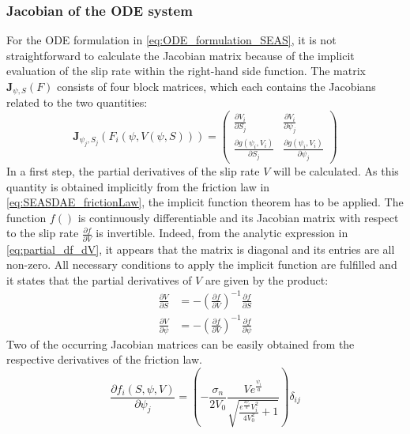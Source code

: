 \subsubsection{Jacobian of the ODE system}
\label{sssec:Jacobian_ODE}
For the ODE formulation in \autoref{eq:ODE_formulation_SEAS}, it is not straightforward to calculate the Jacobian matrix because of the implicit evaluation of the slip rate within the right-hand side function. The matrix $\mathbf{J}_{\psi,S}(F)$ consists of four block matrices, which each contains the Jacobians related to the two quantities:
\begin{equation}
	\label{eq:Jacobian_ODE_formulation}
	\mathbf{J}_{\psi_j,S_j}\left(F_i\left(\psi,V(\psi,S)\right)\right) = \begin{pmatrix} 
	\frac{\partial V_i}{\partial S_j} &
	\frac{\partial V_i}{\partial \psi_j} \\ 
	\frac{\partial g(\psi_i,V_i)}{\partial S_j} &
	\frac{\partial g(\psi_i,V_i)}{\partial \psi_j}  \end{pmatrix}
\end{equation}
In a first step, the partial derivatives of the slip rate $V$ will be calculated. As this quantity is obtained implicitly from the friction law in \autoref{eq:SEASDAE_frictionLaw}, the implicit function theorem has to be applied. The function $f()$ is continuously differentiable and its Jacobian matrix with respect to the slip rate $\frac{\partial f}{\partial V}$ is invertible. Indeed, from the analytic expression in \autoref{eq:partial_df_dV}, it appears that the matrix is diagonal and its entries are all non-zero. All necessary conditions to apply the implicit function are fulfilled and it states that the partial derivatives of $V$ are given by the product:
\begin{align}
	\frac{\partial V}{\partial S} &= -\left(\frac{\partial f}{\partial V}\right)^{-1}\frac{\partial f}{\partial S} \\ 
	\frac{\partial V}{\partial \psi} &= -\left(\frac{\partial f}{\partial V}\right)^{-1}\frac{\partial f}{\partial \psi} 
\end{align}
Two of the occurring Jacobian matrices can be easily obtained from the respective derivatives of the friction law. 
\begin{equation}
\frac{\partial f_i(S,\psi,V)}{\partial \psi_j} = \left( -\frac{\sigma_n}{2V_0} \frac{Ve^{\frac{\psi_i}{a}}}{\sqrt{\frac{e^{\frac{2\psi_i}{a}}V_i^2}{4V_0^2}+1}}\right)\delta_{ij} 
\label{eq:partial_df_dpsi}
\end{equation}	
